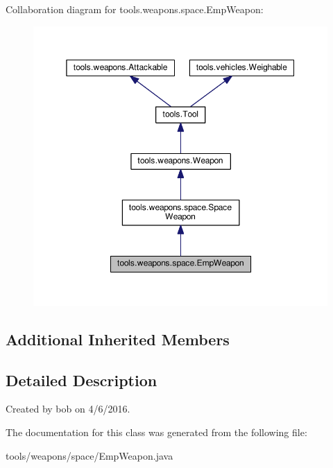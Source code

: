 Collaboration diagram for tools.\+weapons.\+space.\+Emp\+Weapon\+:
\nopagebreak
\begin{figure}[H]
\begin{center}
\leavevmode
\includegraphics[width=350pt]{classtools_1_1weapons_1_1space_1_1_emp_weapon__coll__graph}
\end{center}
\end{figure}
\subsection*{Additional Inherited Members}


\subsection{Detailed Description}
Created by bob on 4/6/2016. 

The documentation for this class was generated from the following file\+:\begin{DoxyCompactItemize}
\item 
tools/weapons/space/Emp\+Weapon.\+java\end{DoxyCompactItemize}
